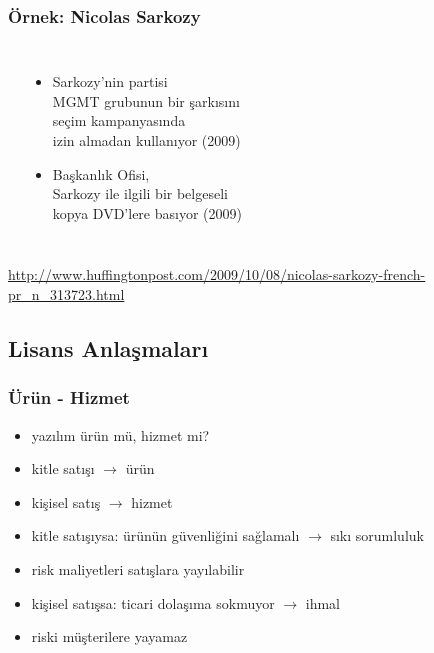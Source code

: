 \documentclass[dvipsnames]{beamer}
\theoremstyle{plain}
\begin{document}
\begin{frame}
  \frametitle{Örnek: Nicolas Sarkozy}

  \begin{columns}
    \begin{center}
    \end{center}

    \begin{itemize}
      \item Sarkozy'nin partisi\\
        MGMT grubunun bir şarkısını\\
        seçim kampanyasında\\
        izin almadan kullanıyor (2009)
      \item Başkanlık Ofisi,\\
        Sarkozy ile ilgili bir belgeseli\\
        kopya DVD'lere basıyor (2009)
    \end{itemize}
  \end{columns}

  \medskip
  \tiny{\url{http://www.huffingtonpost.com/2009/10/08/nicolas-sarkozy-french-pr_n_313723.html}}\\
\end{frame}

\subsection{Lisans Anlaşmaları}

\begin{frame}
  \frametitle{Ürün - Hizmet}

  \begin{itemize}
    \item yazılım ürün mü, hizmet mi?
    \item kitle satışı $\rightarrow$ ürün
    \item kişisel satış $\rightarrow$ hizmet

    \pause
    \bigskip
    \item kitle satışıysa: ürünün güvenliğini sağlamalı $\rightarrow$ sıkı sorumluluk
    \item risk maliyetleri satışlara yayılabilir

    \medskip
    \item kişisel satışsa: ticari dolaşıma sokmuyor $\rightarrow$ ihmal
    \item riski müşterilere yayamaz
  \end{itemize}
\end{frame}
\end{document}
